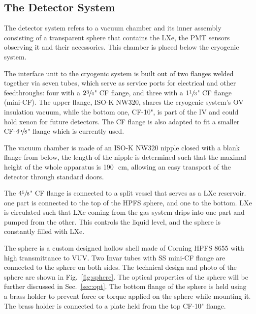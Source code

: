 \subsection{The Detector System}
\label{subsec:det}
 
The detector system refers to a vacuum chamber and its inner assembly consisting of a transparent sphere that 
contains the LXe, the PMT sensors observing it and their accessories. This chamber is placed below the cryogenic system. 


The interface unit to the cryogenic system is built out of two flanges welded together via seven tubes, which serve as service ports for electrical and other feedthroughs: four with a $2 \sfrac{3}{4}$" CF flange, and three with a $1\sfrac{1}{3}$" CF flange (mini-CF). 
The upper flange, ISO-K NW320, shares the cryogenic system's OV insulation vacuum, while the bottom one, CF-10", is part of the IV and could hold xenon for future detectors. 
The CF flange is also adapted to fit a smaller CF-$4\sfrac{5}{8}$" flange which is currently used.

The vacuum chamber is made of an ISO-K NW320 nipple closed with a blank flange from below, 
the length of the nipple is determined such that the maximal height of the whole 
apparatus is 190~\,cm, allowing an easy transport of the detector through standard doors.
 
The $4\sfrac{5}{8}$" CF flange is connected to a split vessel that serves as a LXe reservoir. one part is connected 
to the top of the HPFS sphere, and one to the bottom. LXe is circulated such that LXe coming from the gas system drips into one part and pumped from the other. This controls the liquid level, and the sphere is constantly filled with LXe. 


The sphere is a custom designed hollow shell made of Corning HPFS 8655 with high transmittance to VUV. Two Invar tubes with SS mini-CF flange are connected to the sphere on both sides. The technical design and photo of the sphere are shown in Fig.~\ref{fig:sphere}. The optical properties of the sphere will be further discussed in Sec.~\ref{sec:opt}. 
The bottom flange of the sphere is held using a brass holder to prevent 
force or torque applied on the sphere while mounting it. The 
brass holder is connected to a plate held from the top CF-10" flange. 




